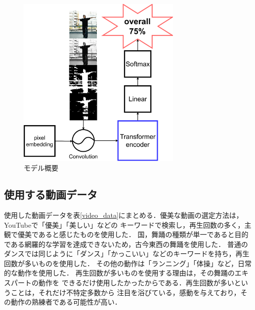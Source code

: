 \begin{figure}[t]
  \begin{center}
    \includegraphics[width=80mm]{images/chart/easy_chart.pdf}
  \end{center}
  \caption{モデル概要}
  \label{easy_chart}
\end{figure}

\subsection{使用する動画データ}
使用した動画データを表\ref{video_data}にまとめる．優美な動画の選定方法は，YouTubeで「優美」「美しい」などの
キーワードで検索し，再生回数の多く，主観で優美であると感じたものを使用した．
国，舞踊の種類が単一であると目的である網羅的な学習を達成できないため，古今東西の舞踊を使用した．
普通のダンスでは同じように「ダンス」「かっこいい」などのキーワードを持ち，再生回数が多いものを使用した．
その他の動作は「ランニング」「体操」など，日常的な動作を使用した．
再生回数が多いものを使用する理由は，その舞踊のエキスパートの動作を
できるだけ使用したかったからである．再生回数が多いということは，それだけ不特定多数から
注目を浴びている，感動を与えており，その動作の熟練者である可能性が高い．
\clearpage

